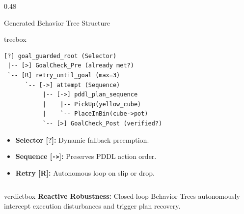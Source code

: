 \documentclass[10pt]{beamer}
\begin{document}
\begin{frame}[fragile,t]
\begin{columns}[T]
    \begin{column}{0.48\textwidth}
        \begin{block}{Generated Behavior Tree Structure}
            \begin{beamercolorbox}[sep=2.5pt,rounded=true]{treebox}
                \fontsize{5.8pt}{6.8pt}\selectfont
\begin{verbatim}
[?] goal_guarded_root (Selector)
 |-- [>] GoalCheck_Pre (already met?)
 `-- [R] retry_until_goal (max=3)
      `-- [->] attempt (Sequence)
           |-- [->] pddl_plan_sequence
           |    |-- PickUp(yellow_cube)
           |    `-- PlaceInBin(cube->pot)
           `-- [>] GoalCheck_Post (verified?)
\end{verbatim}
            \end{beamercolorbox}
            \vspace{0.01cm}
            \begin{itemize}\scriptsize
                \setlength\itemsep{0.02em}
                \item \textbf{Selector [?]:} Dynamic fallback preemption.
                \item \textbf{Sequence [\texttt{->}]:} Preserves PDDL action order.
                \item \textbf{Retry [R]:} Autonomous loop on slip or drop.
            \end{itemize}
        \end{block}
    \end{column}
\end{columns}

\vspace{0.01cm}
\begin{beamercolorbox}[sep=2pt,center,shadow=true,rounded=true]{verdictbox}
    \tiny \textbf{Reactive Robustness:} Closed-loop Behavior Trees autonomously intercept execution disturbances and trigger plan recovery.
\end{beamercolorbox}
\end{frame}
\end{document}
